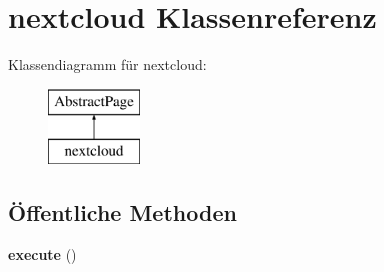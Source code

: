 \hypertarget{classnextcloud}{}\section{nextcloud Klassenreferenz}
\label{classnextcloud}
Klassendiagramm für nextcloud\+:\begin{figure}[H]
\begin{center}
\leavevmode
\includegraphics[height=2.000000cm]{classnextcloud}
\end{center}
\end{figure}
\subsection*{Öffentliche Methoden}
\begin{DoxyCompactItemize}
\item 
\mbox{\label{classnextcloud_ac5a3928ad0da76da36fdb920c3260688}} 
{\bfseries execute} ()
\end{DoxyCompactItemize}
